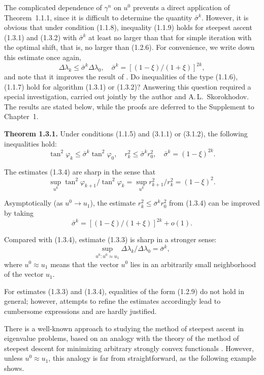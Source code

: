 \documentclass[11pt,oneside]{book}
\begin{document}
The complicated dependence of $\gamma^n$ on $u^0$ prevents a direct application of Theorem~1.1.1, since it is difficult to determine the quantity $\bar{\sigma}^k$. However, it is obvious that under condition (1.1.8), inequality (1.1.9) holds for steepest ascent (1.3.1) and (1.3.2) with $\bar{\sigma}^k$ at least no larger than that for simple iteration with the optimal shift, that is, no larger than (1.2.6). For convenience, we write down this estimate once again,
\[
\Delta\lambda_k \leqslant \bar{\sigma}^k \Delta\lambda_0, \quad \bar{\sigma}^k = [(1 - \xi) / (1 + \xi)]^{2k}, \tag{1.3.3}
\]
and note that it improves the result of \citep{Prikazchikov1975}. Do inequalities of the type (1.1.6), (1.1.7) hold for algorithm (1.3.1) or (1.3.2)? Answering this question required a special investigation, carried out jointly by the author and A.\,L.~Skorokhodov. The results are stated below, while the proofs are deferred to the Supplement to Chapter~1.

\textbf{Theorem 1.3.1.} Under conditions (1.1.5) and (3.1.1) or (3.1.2), %
the following inequalities hold:
\[
\tan^2\varphi_k \leqslant \bar{\sigma}^k \tan^2\varphi_0, \quad r_k^2 \leqslant \bar{\sigma}^k r_0^2, \quad \bar{\sigma}^k = (1 - \xi)^{2k}. \tag{1.3.4}
\]

The estimates (1.3.4) are sharp in the sense that
\[
\sup_{u^k} \tan^2\varphi_{k+1} / \tan^2\varphi_k = \sup_{u^k} r_{k+1}^2 / r_k^2 = (1 - \xi)^2. \tag{1.3.5}
\]

Asymptotically (as $u^0 \to u_1$), the estimate $r_k^2 \leqslant \bar{\sigma}^k r_0^2$ from (1.3.4) can be improved by taking
\[
\bar{\sigma}^k = [(1 - \xi) / (1 + \xi)]^{2k} + o(1). \tag{1.3.6}
\]

Compared with (1.3.4), estimate (1.3.3) is sharp in a stronger sense:
\[
\sup_{u^0 : u^0 \approx u_1} \Delta\lambda_k / \Delta\lambda_0 = \bar{\sigma}^k, \tag{1.3.7}
\]
where $u^0 \approx u_1$ means that the vector $u^0$ lies in an arbitrarily small neighborhood of the vector $u_1$.

For estimates (1.3.3) and (1.3.4), equalities of the form (1.2.9) do not hold in general; however, attempts to refine the estimates accordingly lead to cumbersome expressions and are hardly justified.

There is a well-known approach to studying the method of steepest ascent in eigenvalue problems, based on an analogy with the theory of the method of steepest descent for minimizing arbitrary strongly convex functionals \citep{KantorovichAkilov1984}. However, unless $u^0 \approx u_1$, this analogy is far from straightforward, as the following example shows.
\end{document}
